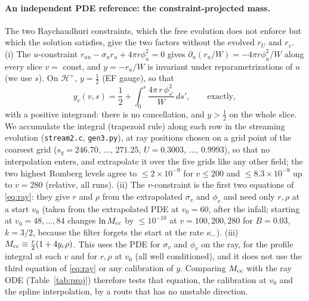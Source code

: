 \documentclass[11pt]{article}
\begin{document}
\paragraph{An independent PDE reference: the constraint-projected mass.} The two Raychaudhuri constraints, which the free evolution does not enforce but which the solution satisfies, give the two factors without the evolved $r_U$ and $r_v$. (i) The $u$-constraint $r_{uu}-\sigma_ur_u+4\pi r\phi_u^2=0$ gives $\partial_u(r_u/W)=-4\pi r\phi_u^2/W$ along every slice $v=$ const, and $y=-r_u/W$ is invariant under reparametrizations of $u$ (we use $s$). On $\mathcal H^+$, $y=\tfrac12$ (EF gauge), so that
\begin{equation}
y_c(v,s)=\frac12+\int_0^{s}\frac{4\pi\,r\,\phi_{s'}^2}{W}\,ds',\qquad\text{exactly},
\label{eq:yc}
\end{equation}
with a positive integrand: there is no cancellation, and $y>\tfrac12$ on the whole slice. We accumulate the integral (trapezoid rule) along each row in the streaming evolution (\texttt{stream2.c}, \texttt{gen3.py}), at ray positions chosen on a grid point of the coarsest grid ($s_q=246.70,\,\dots,\,271.25$, $U=0.3003,\,\dots,\,0.9993$), so that no interpolation enters, and extrapolate it over the five grids like any other field; the two highest Romberg levels agree to $\le2\times10^{-9}$ for $v\le200$ and $\le8.3\times10^{-9}$ up to $v=280$ (relative, all runs). (ii) The $v$-constraint is the first two equations of \eqref{eq:ray}: they give $r$ and $\rho$ from the extrapolated $\sigma_v$ and $\phi_v$ and need only $r,\rho$ at a start $v_0$ (taken from the extrapolated PDE at $v_0=60$, after the infall; starting at $v_0=48,\dots,84$ changes $\ln M_{\rm cc}$ by $\le10^{-10}$ at $v=100,200,280$ for $B=0.03$, $k=3/2$, because the filter forgets the start at the rate $\kappa_-$). (iii) $M_{\rm cc}\equiv\tfrac r2(1+4y_c\rho)$. This uses the PDE for $\sigma_v$ and $\phi_v$ on the ray, for the profile integral at each $v$ and for $r,\rho$ at $v_0$ (all well conditioned), and it does not use the third equation of \eqref{eq:ray} or any calibration of $y$. Comparing $M_{\rm cc}$ with the ray ODE (Table~\ref{tab:proj}) therefore tests that equation, the calibration at $v_0$ and the spline interpolation, by a route that has no unstable direction.
\end{document}
